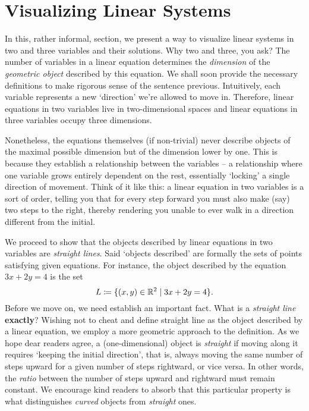 \section{Visualizing Linear Systems}
\label{sec:visualizing-linear-systems}

In this, rather informal, section, we present a way to visualize linear systems
in two and three variables and their solutions. Why two and three, you ask? The
number of variables in a linear equation determines the \emph{dimension} of the
\emph{geometric object} described by this equation. We shall soon provide the
necessary definitions to make rigorous sense of the sentence previous.
Intuitively, each variable represents a new `direction' we're allowed to move
in. Therefore, linear equations in two variables live in two-dimensional spaces
and linear equations in three variables occupy three dimensions.

Nonetheless, the equations themselves (if non-trivial) never describe objects of
the maximal possible dimension but of the dimension lower by one. This is
because they establish a relationship between the variables -- a relationship
where one variable grows entirely dependent on the rest, essentially `locking' a
single direction of movement. Think of it like this: a linear equation in two
variables is a sort of order, telling you that for every step forward you must
also make (say) two steps to the right, thereby rendering you unable to ever
walk in a direction different from the initial.

We proceed to show that the objects described by linear equations in two
variables are \emph{straight lines}. Said `objects described' are formally the
sets of points satisfying given equations. For instance, the object described by
the equation $3x + 2y = 4$ is the set
\[
 L \coloneqq \{(x,y) \in \mathbb{R}^2 \mid 3x + 2y = 4\}.
\]
Before we move on, we need establish an important fact. What is a \emph{straight
line} \textbf{exactly}? Wishing not to cheat and define straight line as the
object described by a linear equation, we employ a more geometric approach to
the definition. As we hope dear readers agree, a (one-dimensional) object is
\emph{straight} if moving along it requires `keeping the initial direction',
that is, always moving the same number of steps upward for a given number of
steps rightward, or vice versa. In other words, the \emph{ratio} between the
number of steps upward and rightward must remain constant. We encourage kind
readers to absorb that this particular property is what distinguishes
\emph{curved} objects from \emph{straight} ones.

